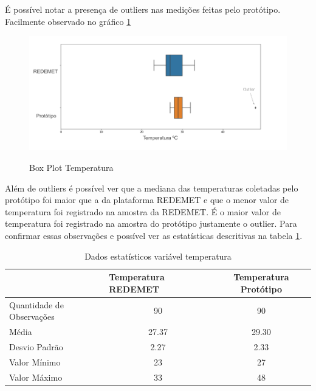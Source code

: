 É possível notar a presença de outliers nas medições feitas pelo protótipo. Facilmente observado no gráfico \ref{fig:box_temp}

\begin{figure} [!h]
    \centering
    \caption{Box Plot Temperatura}    
    \includegraphics [scale = 0.45] {Figuras/box_temp.png}
    \label{fig:box_temp}
\end{figure}

Além de outliers é possível ver que a mediana das temperaturas coletadas pelo protótipo foi maior que a da plataforma REDEMET e que o menor valor de temperatura foi registrado na amostra da REDEMET. É o maior valor de temperatura foi registrado na amostra do protótipo justamente o outlier. Para confirmar essas observações e possível ver as estatísticas descritivas na tabela \ref{tab:est_desc_temp_prot}.

\begin{table}[!h]
\centering
\begin{tabular}{l|c|c|}
\cline{2-3}
                                                & \multicolumn{1}{l|}{\textbf{Temperatura REDEMET}} & \textbf{Temperatura Protótipo} \\ \hline
\multicolumn{1}{|l|}{Quantidade de Observações} & 90                                                & 90                             \\ \hline
\multicolumn{1}{|l|}{Média}                     & 27.37                                             & 29.30                          \\ \hline
\multicolumn{1}{|l|}{Desvio Padrão}             & 2.27                                              & 2.33                           \\ \hline
\multicolumn{1}{|l|}{Valor Mínimo}              & 23                                                & 27                             \\ \hline
\multicolumn{1}{|l|}{Valor Máximo}              & 33                                                & 48                             \\ \hline
\end{tabular}
\caption{Dados estatísticos variável temperatura}
\label{tab:est_desc_temp_prot}
\end{table}

